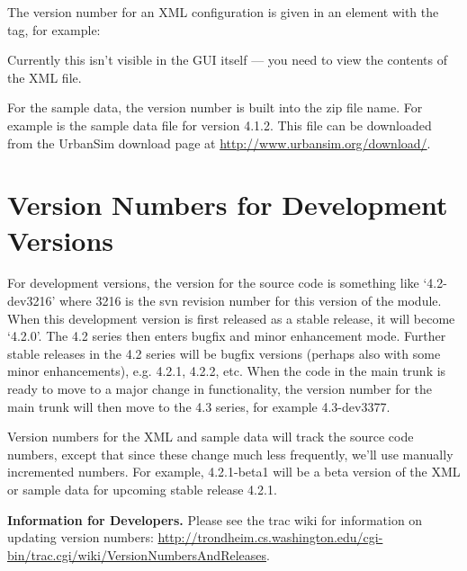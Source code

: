 The version number for an XML configuration is given in an element with the
 tag, for example:


Currently this isn't visible in the GUI itself --- you need to view the
contents of the XML file.

For the sample data, the version number is built into the zip file name.
For example  is the sample data file for version
4.1.2.  This file can be downloaded from the UrbanSim download page at
\url{http://www.urbansim.org/download/}.

\section{Version Numbers for Development Versions}

For development versions, the version for the source code is something like
`4.2-dev3216' where 3216 is the svn revision number for this version of the
module. When this development version is first released as a stable
release, it will become `4.2.0'. The 4.2 series then enters bugfix and
minor enhancement mode.  Further stable releases in the 4.2 series will be
bugfix versions (perhaps also with some minor enhancements), e.g. 4.2.1,
4.2.2, etc.  When the code in the main trunk is ready to move to a major
change in functionality, the version number for the main trunk will then
move to the 4.3 series, for example 4.3-dev3377.

Version numbers for the XML and sample data will track the source code
numbers, except that since these change much less frequently, we'll use
manually incremented numbers.  For example, 4.2.1-beta1 will be a beta
version of the XML or sample data for upcoming stable release 4.2.1.

{\bf Information for Developers.}  Please see the trac wiki for information
on updating version numbers:
\url{http://trondheim.cs.washington.edu/cgi-bin/trac.cgi/wiki/VersionNumbersAndReleases}.

